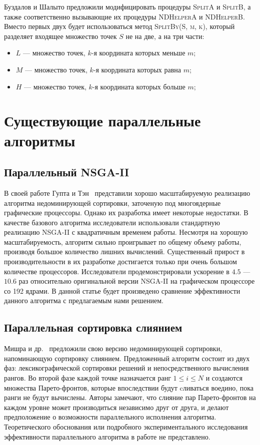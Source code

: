 Буздалов и Шалыто предложили модифицировать процедуры \textsc{SplitA} и \textsc{SplitB}, а также соответственно вызывающие их процедуры \textsc{NDHelperA} и \textsc{NDHelperB}.
Вместо первых двух будет использоваться метод \textsc{SplitBy(S, m, k)}, который разделяет входящее множество точек $S$ не на две, а на три части:
\begin{itemize}
    \item $L$ --- множество точек, $k$-я координата которых меньше $m$;
    \item $M$ --- множество точек, $k$-я координата которых равна $m$;
    \item $H$ --- множество точек, $k$-я координата которых больше $m$;
\end{itemize}



\section{Существующие параллельные алгоритмы}
\subsection{Параллельный NSGA-II}
В своей работе Гупта и Тэн~\cite{gupta15} представили хорошо масштабируемую реализацию алгоритма недоминирующей сортировки, заточеную под многоядерные графические процессоры.
Однако их разработка имеет некоторые недостатки. В качестве базового алгоритма исследователи использовали стандартную реализацию NSGA-II с квадратичным временем работы.
Несмотря на хорошую масштабируемость, алгоритм сильно проигрывает по общему объему работы, производя большое количество лишних вычислений.
Существенный прирост в производительности в их разработке достигается только при очень большом количестве процессоров. 
Исследователи продемонстрировали ускорение в $4.5$ --- $10.6$ раз относительно оригинальной версии NSGA-II на графическом процессоре со 192 ядрами.
В данной статье будет произведено сравнение эффективности данного алгоритма с предлагаемым нами решением.

\subsection{Параллельная сортировка слиянием}
Мишра и др.~\cite{mishra16} предложили свою версию недоминирующей сортировки, напоминающую сортировку слиянием.
Предложенный алгоритм состоит из двух фаз: лексикографической сортировки решений и непосредственного вычисления рангов.
Во второй фазе каждой точке назначается ранг $1\leq i \leq N$ и создаются множества Парето-фронтов, которые впоследствии будут cливаться воедино, пока ранги не будут вычислены.
Авторы замечают, что слияние пар Парето-фронтов на каждом уровне может производиться независимо друг от друга, и делают предположение о возможности параллельного исполнения алгоритма.
Теоретического обоснования или подробного экспериментального исследования эффективности параллельного алгоритма в работе не представлено.

